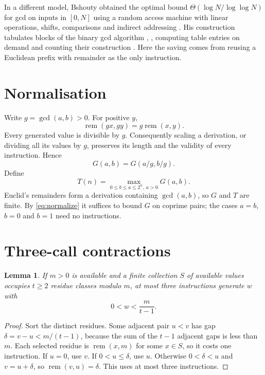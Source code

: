 \documentclass[11pt]{article}
\newtheorem{lemma}[theorem]{Lemma}
\theoremstyle{remark}
\newcommand{\rem}{\operatorname{rem}}
\begin{document}
In a different model, Bshouty obtained the optimal bound
$\Theta(\log N/\log\log N)$ for gcd on inputs in $[0,N]$ using a random
access machine with linear operations, shifts, comparisons and indirect
addressing \cite[Theorems~i and~ii, p.~3]{bshouty1989}. His construction
tabulates blocks of the binary gcd algorithm \cite{stein1967},
\cite[\S4.5.2]{knuth1997}, computing table entries on demand and counting
their construction \cite[\S4, Algorithm~D and Lemma~5, pp.~12--14]{bshouty1989}.
Here the saving comes from
reusing a Euclidean prefix with remainder as the only instruction.

\section{Normalisation}\label{sec:normalization}
Write $g=\gcd(a,b)>0$. For positive $y$,
\[
\rem(gx,gy)=g\rem(x,y).
\]
Every generated value is divisible by $g$. Consequently scaling a derivation,
or dividing all its values by $g$, preserves its length and the validity of
every instruction. Hence
\begin{equation}\label{eq:normalize}
G(a,b)=G(a/g,b/g).
\end{equation}
Define
\[
T(n)=\max_{0\leq b\leq a\leq 2^n,\ a>0}G(a,b).
\]
Euclid's remainders form a derivation containing $\gcd(a,b)$, so $G$ and
$T$ are finite. By \eqref{eq:normalize} it
suffices to bound $G$ on coprime pairs; the cases $a=b$, $b=0$ and $b=1$ need no instructions.

\section{Three-call contractions}\label{sec:contractions}
\begin{lemma}\label{lem:gap}
If $m>0$ is available and a finite collection $S$ of available values occupies
$t\geq2$ residue classes modulo $m$, at most three instructions generate $w$
with
\[
0<w<\frac{m}{t-1}.
\]
\end{lemma}
\begin{proof}
Sort the distinct residues. Some adjacent pair $u<v$ has gap
$\delta=v-u<m/(t-1)$, because the sum of the $t-1$ adjacent gaps is less than
$m$. Each selected residue is $\rem(x,m)$ for some $x\in S$, so it costs one
instruction. If $u=0$, use $v$. If $0<u\leq\delta$, use $u$. Otherwise
$0<\delta<u$ and $v=u+\delta$, so $\rem(v,u)=\delta$. This uses at most three
instructions.
\end{proof}
\end{document}
